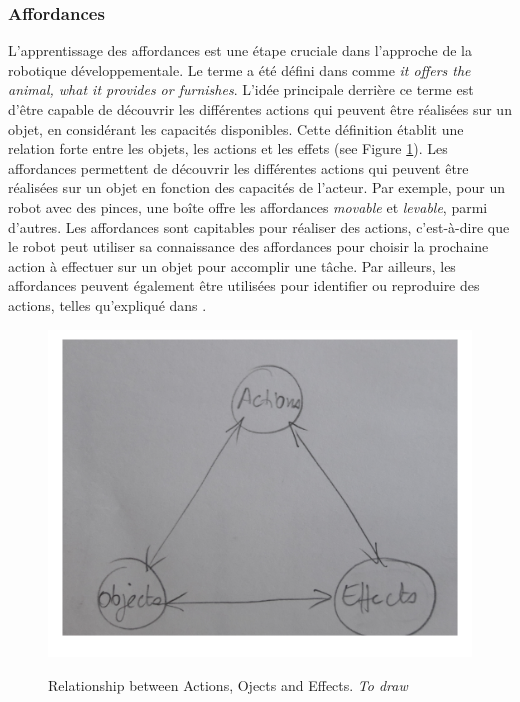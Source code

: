 \documentclass{llncs}
\begin{document}
\subsubsection{Affordances}
L'apprentissage des affordances est une étape cruciale dans l'approche de la robotique développementale. Le terme a été défini dans \cite{opac-b1085639} comme \textit{it offers the animal, what it provides or furnishes}. L'idée principale derrière ce terme est d'être capable de découvrir les différentes actions qui peuvent être réalisées sur un objet, en considérant les capacités disponibles. Cette définition établit une relation forte entre les objets, les actions et les effets (see Figure \ref{fig:affordances}). Les affordances permettent de découvrir les différentes actions qui peuvent être réalisées sur un objet en fonction des capacités de l'acteur. Par exemple, pour un robot avec des pinces, une boîte offre les affordances  \textit{movable} et \textit{levable}, parmi d'autres. Les affordances sont capitables pour réaliser des actions, c'est-à-dire que le robot peut utiliser sa connaissance des affordances pour choisir la prochaine action à effectuer sur un objet pour accomplir une tâche. Par ailleurs, les affordances peuvent également être utilisées pour identifier ou reproduire des actions, telles qu'expliqué dans \cite{4399517}.


\begin{figure}
	\centering
	\includegraphics[width=.4\textwidth]{figures/affordances}
	\label{fig:affordances}
	\caption{Relationship between Actions, Ojects and Effects. \textit{To draw}}
\end{figure}
\end{document}
